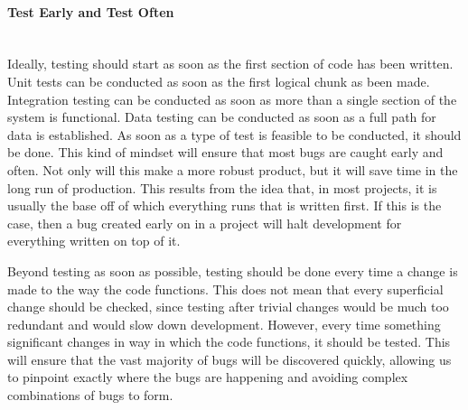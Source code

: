 \paragraph{Test Early and Test Often} \mbox{}\\[\paragraphheaderspace]
Ideally, testing should start as soon as the first section of code has been written. Unit tests can be conducted as soon as the first logical chunk as been made. Integration testing can be conducted as soon as more than a single section of the system is functional. Data testing can be conducted as soon as a full path for data is established. As soon as a type of test is feasible to be conducted, it should be done. This kind of mindset will ensure that most bugs are caught early and often. Not only will this make a more robust product, but it will save time in the long run of production. This results from the idea that, in most projects, it is usually the base off of which everything runs that is written first. If this is the case, then a bug created early on in a project will halt development for everything written on top of it.\par
Beyond testing as soon as possible, testing should be done every time a change is made to the way the code functions. This does not mean that every superficial change should be checked, since testing after trivial changes would be much too redundant and would slow down development. However, every time something significant changes in way in which the code functions, it should be tested. This will ensure that the vast majority of bugs will be discovered quickly, allowing us to pinpoint exactly where the bugs are happening and avoiding complex combinations of bugs to form.

